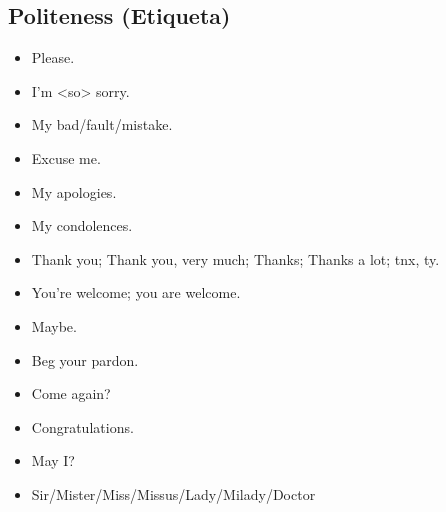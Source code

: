 \documentclass[12pt,a4paper]{article} %
\begin{document}
\subsection{Politeness (Etiqueta)}
\begin{itemize}
\item Please.
\item I'm <so> sorry.
\item My bad/fault/mistake.
\item Excuse me.
\item My apologies.
\item My condolences.
\item Thank you; Thank you, very much; Thanks; Thanks a lot; tnx, ty.
\item You're welcome; you are welcome.
\item Maybe.
\item Beg your pardon.
\item Come again?
\item Congratulations.
\item May I?
\item Sir/Mister/Miss/Missus/Lady/Milady/Doctor
\end{itemize}
\end{document}
